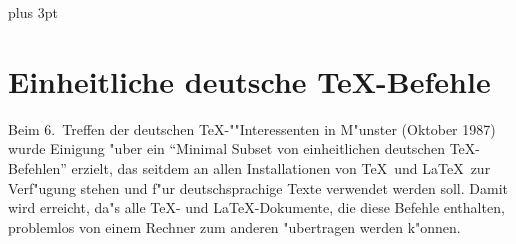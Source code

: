 
\parindent=0pt
\parskip=6pt plus 3pt
\sloppy



\section*{Einheitliche deutsche \TeX-Befehle}

Beim 6.~Treffen der deutschen \TeX-""Interessenten in M"unster (Oktober 1987)
wurde Einigung "uber ein
"`Minimal Subset von einheitlichen deutschen \TeX-Befehlen"'
erzielt, das seitdem an allen Installationen von \TeX\ und \LaTeX\
zur Verf"ugung stehen und
f"ur deutschsprachige Texte verwendet werden soll.
Damit wird erreicht, da"s alle \TeX- und \LaTeX-Dokumente,
die diese Befehle enthalten,
problemlos von einem Rechner zum anderen "ubertragen werden k"onnen.

